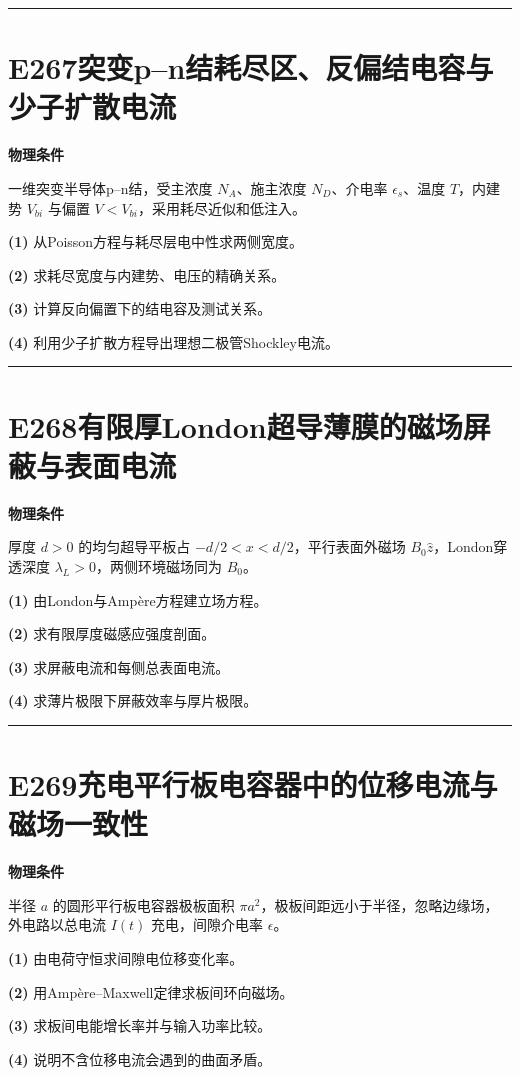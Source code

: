 \documentclass[UTF8,a4paper,11pt,oneside,openany]{ctexbook}
\begin{document}
\par\bigskip\hrule\bigskip
\section*{E267\quad 突变p–n结耗尽区、反偏结电容与少子扩散电流}
\textbf{物理条件}\par 一维突变半导体p–n结，受主浓度 \(N_A\)、施主浓度 \(N_D\)、介电率 \(\epsilon_s\)、温度 \(T\)，内建势 \(V_{bi}\) 与偏置 \(V<V_{bi}\)，采用耗尽近似和低注入。
\par\noindent\textbf{(1)} 从Poisson方程与耗尽层电中性求两侧宽度。
\par\noindent\textbf{(2)} 求耗尽宽度与内建势、电压的精确关系。
\par\noindent\textbf{(3)} 计算反向偏置下的结电容及测试关系。
\par\noindent\textbf{(4)} 利用少子扩散方程导出理想二极管Shockley电流。

\par\bigskip\hrule\bigskip
\section*{E268\quad 有限厚London超导薄膜的磁场屏蔽与表面电流}
\textbf{物理条件}\par 厚度 \(d>0\) 的均匀超导平板占 \(-d/2<x<d/2\)，平行表面外磁场 \(B_0\hat z\)，London穿透深度 \(\lambda_L>0\)，两侧环境磁场同为 \(B_0\)。
\par\noindent\textbf{(1)} 由London与Ampère方程建立场方程。
\par\noindent\textbf{(2)} 求有限厚度磁感应强度剖面。
\par\noindent\textbf{(3)} 求屏蔽电流和每侧总表面电流。
\par\noindent\textbf{(4)} 求薄片极限下屏蔽效率与厚片极限。

\par\bigskip\hrule\bigskip
\section*{E269\quad 充电平行板电容器中的位移电流与磁场一致性}
\textbf{物理条件}\par 半径 \(a\) 的圆形平行板电容器极板面积 \(\pi a^2\)，极板间距远小于半径，忽略边缘场，外电路以总电流 \(I(t)\) 充电，间隙介电率 \(\epsilon\)。
\par\noindent\textbf{(1)} 由电荷守恒求间隙电位移变化率。
\par\noindent\textbf{(2)} 用Ampère–Maxwell定律求板间环向磁场。
\par\noindent\textbf{(3)} 求板间电能增长率并与输入功率比较。
\par\noindent\textbf{(4)} 说明不含位移电流会遇到的曲面矛盾。
\end{document}
